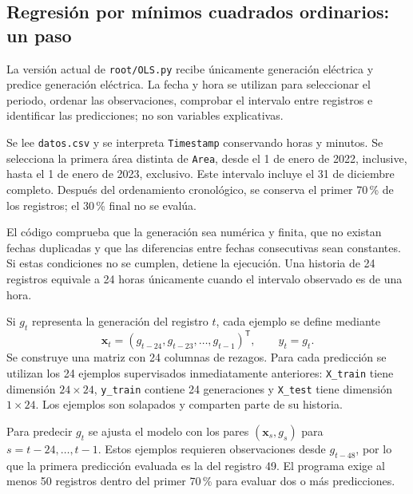 \subsection{Regresión por mínimos cuadrados ordinarios: un paso}
\label{subsec:ols-univariante}

La versión actual de \texttt{root/OLS.py} recibe únicamente generación eléctrica y predice generación eléctrica. La fecha y hora se utilizan para seleccionar el periodo, ordenar las observaciones, comprobar el intervalo entre registros e identificar las predicciones; no son variables explicativas.

Se lee \texttt{datos.csv} y se interpreta \texttt{Timestamp} conservando horas y minutos. Se selecciona la primera área distinta de \texttt{Area}, desde el 1 de enero de 2022, inclusive, hasta el 1 de enero de 2023, exclusivo. Este intervalo incluye el 31 de diciembre completo. Después del ordenamiento cronológico, se conserva el primer 70\,\% de los registros; el 30\,\% final no se evalúa.

El código comprueba que la generación sea numérica y finita, que no existan fechas duplicadas y que las diferencias entre fechas consecutivas sean constantes. Si estas condiciones no se cumplen, detiene la ejecución. Una historia de 24 registros equivale a 24 horas únicamente cuando el intervalo observado es de una hora.

Si $g_t$ representa la generación del registro $t$, cada ejemplo se define mediante
\begin{equation}
\boldsymbol{x}_t=(g_{t-24},g_{t-23},\ldots,g_{t-1})^{\mathsf T},
\qquad y_t=g_t.
\end{equation}
Se construye una matriz con 24 columnas de rezagos. Para cada predicción se utilizan los 24 ejemplos supervisados inmediatamente anteriores: \texttt{X\_train} tiene dimensión $24\times24$, \texttt{y\_train} contiene 24 generaciones y \texttt{X\_test} tiene dimensión $1\times24$. Los ejemplos son solapados y comparten parte de su historia.

Para predecir $g_t$ se ajusta el modelo con los pares $(\boldsymbol{x}_s,g_s)$ para $s=t-24,\ldots,t-1$. Estos ejemplos requieren observaciones desde $g_{t-48}$, por lo que la primera predicción evaluada es la del registro 49. El programa exige al menos 50 registros dentro del primer 70\,\% para evaluar dos o más predicciones.

